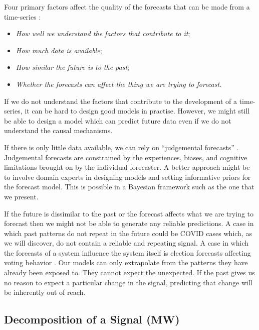 \documentclass{article}
\begin{document}
\noindent Four primary factors affect the quality of the forecasts that can be made from a time-series \cite{fpp3}:

\begin{itemize}
    \item \textit{How well we understand the factors that contribute to it};
    \item \textit{How much data is available};
    \item \textit{How similar the future is to the past};
    \item \textit{Whether the forecasts can affect the thing we are trying to forecast}.
\end{itemize}

\noindent If we do not understand the factors that contribute to the development of a time-series, it can be hard to design good models in practise. However, we might still be able to design a model which can predict future data even if we do not understand the causal mechanisms. 

\noindent If there is only little data available, we can rely on “judgemental forecasts” \cite{fpp3}. Judgemental forecasts are constrained by the experiences, biases, and cognitive limitations brought on by the individual forecaster. A better approach might be to involve domain experts in designing models and setting informative priors for the forecast model.  This is possible in a Bayesian framework such as the one that we present.

\noindent If the future is dissimilar to the past or the forecast affects what we are trying to forecast then we might not be able to generate any reliable predictions. A case in which past patterns do not repeat in the future could be COVID cases which, as we will discover, do not contain a reliable and repeating signal. A case in which the forecasts of a system influence the system itself is election forecasts affecting voting behavior \cite{exit-polls1, exit-polls2,exit-polls3}. Our models can only extrapolate from the patterns they have already been exposed to. They cannot expect the unexpected. If the past gives us no reason to expect a particular change in the signal, predicting that change will be inherently out of reach. 

\subsection{Decomposition of a Signal (MW)}
\end{document}
